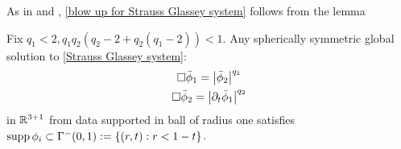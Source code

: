 \documentclass[11pt, oneside]{amsart}
\begin{document}
	
	As in \cite{john_blow-up_1979} and \cite{yang_revisit_2016}, \cref{blow up for Strauss Glassey system} follows from the lemma
	\begin{lemma}\label{compact support lemma}
		Fix $q_1<2,q_1q_2(q_2-2+q_2(q_1-2))<1$. Any spherically symmetric global solution to \cref{Strauss Glassey system}:
		\begin{equation*}
			\begin{gathered}
				\Box\bar{\phi}_1=\left\lvert \bar{\phi}_2\right\rvert^{q_1}\\
				\Box\bar{\phi}_2=\left\lvert \partial_t\bar{\phi}_1\right\rvert^{q_2}
			\end{gathered}
		\end{equation*}
		in $\mathbb{R}^{3+1}$ from data supported in ball of radius one satisfies $\operatorname{supp}\phi_i\subset\Gamma^-(0,1):=\{(r,t):r<1-t\}$.
	\end{lemma}
\end{document}

